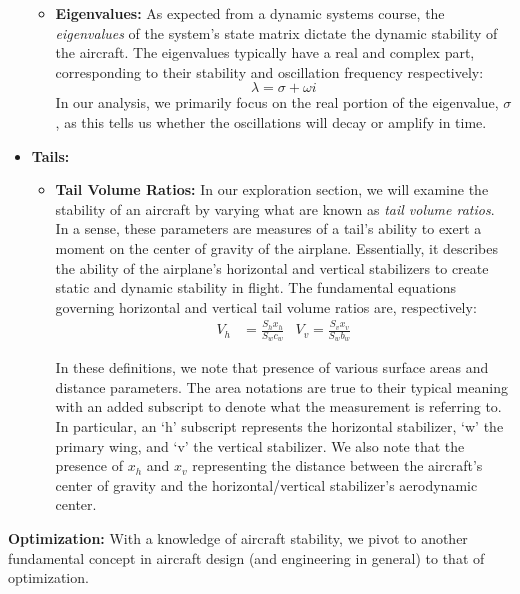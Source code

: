 \documentclass{article}
\begin{document}
\begin{itemize}
\begin{itemize}
            \item[] \textbf{Eigenvalues:} As expected from a dynamic systems course, the \textit{eigenvalues} of the system's state matrix dictate the dynamic stability of the aircraft.
    The eigenvalues typically have a real and complex part, corresponding to their stability and oscillation frequency respectively:
    \begin{equation}
    \lambda = \sigma + \omega i
    \end{equation}
    In our analysis, we primarily focus on the real portion of the eigenvalue, $\sigma$, as this tells us whether the oscillations will decay or amplify in time.
        \end{itemize}


    \item[] \textbf{Tails:}
        \begin{itemize}
            \item[] \textbf{Tail Volume Ratios:} In our exploration section, we will examine the stability of an aircraft by varying what are known as \textit{tail volume ratios}. In a sense, these parameters are measures of a tail's ability to exert a moment on the center of gravity of the airplane.
            Essentially, it describes the ability of the airplane's horizontal and vertical stabilizers to create static and dynamic stability in flight. The fundamental equations governing horizontal and vertical tail volume ratios are, respectively:
            \begin{align}
            V_h &= \frac{S_h x_h}{S_w c_w} &
            V_v = \frac{S_v x_v}{S_w b_w}
            \end{align}

            In these definitions, we note that presence of various surface areas and distance parameters. The area notations are true to their typical meaning with an added subscript to denote what the measurement is referring to.
            In particular, an `h' subscript represents the horizontal stabilizer, `w' the primary wing, and `v' the vertical stabilizer. We also note that the presence of $x_h$ and $x_v$ representing the distance between the aircraft's center of gravity and the horizontal/vertical stabilizer's aerodynamic center.

        \end{itemize}
\end{itemize}
\textbf{Optimization:} With a knowledge of aircraft stability, we pivot to another fundamental concept in aircraft design (and engineering in general) to that of optimization.
\end{document}
